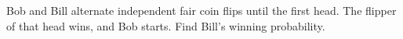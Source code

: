 Bob and Bill alternate independent fair coin flips until the first head. The flipper of that head wins, and Bob starts. Find Bill's winning probability.
